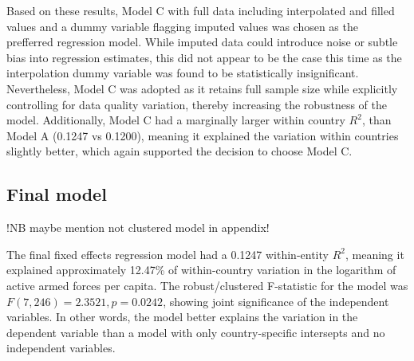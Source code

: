 Based on these results, Model C with full data including interpolated and filled values and a dummy 
variable flagging imputed values was chosen
as the prefferred regression model. While imputed data could introduce noise or subtle bias
into regression estimates, this did not appear to be the case this time as the interpolation dummy 
variable was found to be statistically insignificant. 
Nevertheless, Model C was adopted as it retains full sample size while explicitly controlling 
for data quality variation, thereby increasing the robustness of the model.
Additionally, Model C had a marginally larger within country 
$R^2$, than Model A (0.1247 vs 0.1200), meaning it explained the variation within countries 
slightly better, which again supported the decision to choose Model C.

\subsection{Final model}

!NB maybe mention not clustered model in appendix!

The final fixed effects regression model had a 0.1247 within-entity $R^2$, meaning it explained 
approximately 12.47\% of within-country variation in the logarithm of active armed forces per capita.
The robust/clustered F-statistic for the model was $F(7, 246)=2.3521, p=0.0242$, 
showing joint significance of the independent variables.
In other words, the model better explains the variation in the dependent variable than a model with 
only country-specific intersepts and no independent variables. 

\renewcommand{\arraystretch}{1.3}

